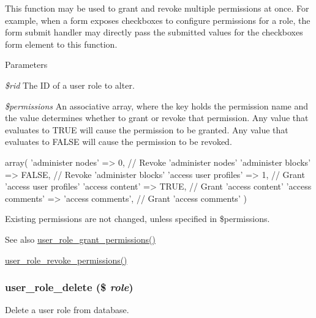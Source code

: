 This function may be used to grant and revoke multiple permissions at once. For example, when a form exposes checkboxes to configure permissions for a role, the form submit handler may directly pass the submitted values for the checkboxes form element to this function.


\begin{DoxyParams}{Parameters}
\item[{\em \$rid}]The ID of a user role to alter. \item[{\em \$permissions}]An associative array, where the key holds the permission name and the value determines whether to grant or revoke that permission. Any value that evaluates to TRUE will cause the permission to be granted. Any value that evaluates to FALSE will cause the permission to be revoked. 
\begin{DoxyCode}
     array(
       'administer nodes' => 0,                // Revoke 'administer nodes'
       'administer blocks' => FALSE,           // Revoke 'administer blocks'
       'access user profiles' => 1,            // Grant 'access user profiles'
       'access content' => TRUE,               // Grant 'access content'
       'access comments' => 'access comments', // Grant 'access comments'
     )
\end{DoxyCode}
 Existing permissions are not changed, unless specified in \$permissions.\end{DoxyParams}
\begin{DoxySeeAlso}{See also}
\hyperlink{user_8module_aee75b0b96b7cec455cb0245275469aaf}{user\_\-role\_\-grant\_\-permissions()} 

\hyperlink{user_8module_a5b4cb135247dfac81c93c8da05bcd514}{user\_\-role\_\-revoke\_\-permissions()} 
\end{DoxySeeAlso}
\hypertarget{user_8module_a024c3e56a5d80847b3796565df75299f}{
\subsubsection[{user\_\-role\_\-delete}]{\setlength{\rightskip}{0pt plus 5cm}user\_\-role\_\-delete (\$ {\em role})}}
\label{user_8module_a024c3e56a5d80847b3796565df75299f}
Delete a user role from database.


